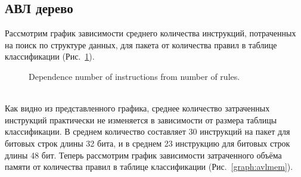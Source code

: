 \documentclass[9pt,a4paper]{article}
\begin{document}
        \subsection{АВЛ дерево}
            Рассмотрим график зависимости среднего количества инструкций, потраченных на поиск по структуре данных, для пакета от количества правил в таблице классификации (Рис.~\ref{graph:avlinst}).
            \begin{figure}[ht]
                \centering
                \captionsetup{justification=centering}
                \caption{Dependence number of instructions from number of rules.}
                \label{graph:avlinst}
            \end{figure}
            \\
            Как видно из представленного графика, среднее количество затраченных инструкций практически не изменяется в зависимости от размера таблицы классификации. 
            В среднем количество составляет 30 инструкций на пакет для битовых строк длины 32 бита, и в среднем 23 инструкцию для битовых строк длины 48 бит.
            Теперь рассмотрим график зависимости затраченного объёма памяти от количества правил в таблице классификации (Рис.~\ref{graph:avlmem}).
            \\
\end{document}

